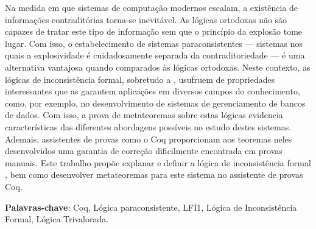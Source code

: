 
\setlength{\absparsep}{18pt} %
\begin{resumo}
    Na medida em que sistemas de computação modernos escalam, a existência de informações contraditórias torna-se inevitável. As lógicas ortodoxas não são capazes de tratar este tipo de informação sem que o princípio da explosão tome lugar. Com isso, o estabelecimento de sistemas paraconsistentes {---} sistemas nos quais a explosividade é cuidadosamente separada da contraditoriedade {---} é uma alternativa vantajosa quando comparados às lógicas ortodoxas. Neste contexto, as lógicas de inconsistência formal, sobretudo a \lfium{}, usufruem de propriedades interessantes que as garantem aplicações em diversos campos do conhecimento, como, por exemplo, no desenvolvimento de sistemas de gerenciamento de bancos de dados. Com isso, a prova de metateoremas sobre estas lógicas evidencia características das diferentes abordagens possíveis no estudo destes sistemas. Ademais, assistentes de provas como o Coq proporcionam aos teoremas neles desenvolvidos uma garantia de correção dificilmente encontrada em provas manuais. Este trabalho propõe explanar e definir a lógica de inconsistência formal \lfium{}, bem como desenvolver metateoremas para este sistema no assistente de provas Coq.

 \textbf{Palavras-chave}: Coq, Lógica paraconsistente, LFI1, Lógica de Inconsistência Formal, Lógica Trivalorada.
\end{resumo}
